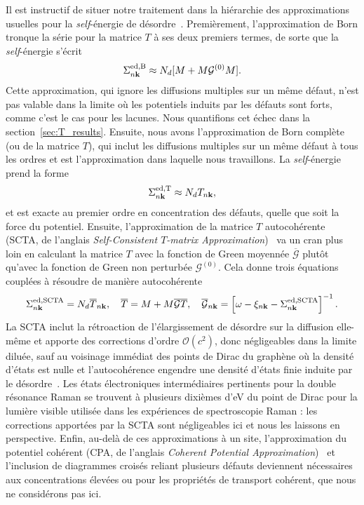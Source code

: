 Il est instructif de situer notre traitement dans la hiérarchie des approximations usuelles pour la \textit{self}-énergie de désordre~\cite{elliottTheoryPropertiesRandomly1974}. Premièrement, l'approximation de Born tronque la série pour la matrice $T$ à ses deux premiers termes, de sorte que la \textit{self}-énergie s'écrit
\begin{equation}
    \Sigma_{n\mathbf{k}}^\text{ed,B}\approx N_d[M+M\mathcal{G}^{(0)}M].
\end{equation}
Cette approximation, qui ignore les diffusions multiples sur un même défaut, n'est pas valable dans la limite où les potentiels induits par les défauts sont forts, comme c'est le cas pour les lacunes. Nous quantifions cet échec dans la section~\ref{sec:T_results}. Ensuite, nous avons l'approximation de Born complète (ou de la matrice $T$), qui inclut les diffusions multiples sur un même défaut à tous les ordres et est l'approximation dans laquelle nous travaillons. La \textit{self}-énergie prend la forme
\begin{equation}
    \Sigma_{n\mathbf{k}}^{\text{ed,T}}\approx N_dT_{n\mathbf{k}},
\end{equation}
et est exacte au premier ordre en concentration des défauts, quelle que soit la force du potentiel. Ensuite, l'approximation de la matrice $T$ autocohérente (SCTA, de l'anglais \textit{Self-Consistent $T$-matrix Approximation})~\cite{klauderModificationElectronEnergy1961,peresElectronicPropertiesDisordered2006} va un cran plus loin en calculant la matrice $T$ avec la fonction de Green moyennée $\overline{\mathcal{G}}$ plutôt qu'avec la fonction de Green non perturbée $\mathcal{G}^{(0)}$. Cela donne trois équations couplées à résoudre de manière autocohérente
\begin{equation}
    \Sigma_{n\mathbf{k}}^\text{ed,SCTA} = N_d\overline{T}_{n\mathbf{k}},\quad \overline{T} = M+M\overline{\mathcal{G}}\overline{T},\quad \overline{\mathcal{G}}_{n\mathbf{k}} = \left[\omega-\xi_{n\mathbf{k}}-\Sigma_{n\mathbf{k}}^\text{ed,SCTA} \right]^{-1}.
\end{equation}
La SCTA inclut la rétroaction de l'élargissement de désordre sur la diffusion elle-même et apporte des corrections d'ordre $\mathcal{O}(c^2)$, donc négligeables dans la limite diluée, sauf au voisinage immédiat des points de Dirac du graphène où la densité d'états est nulle et l'autocohérence engendre une densité d'états finie induite par le désordre~\cite{peresElectronicPropertiesDisordered2006}. Les états électroniques intermédiaires pertinents pour la double résonance Raman se trouvent à plusieurs dixièmes d'eV du point de Dirac pour la lumière visible utilisée dans les expériences de spectroscopie Raman : les corrections apportées par la SCTA sont négligeables ici et nous les laissons en perspective. Enfin, au-delà de ces approximations à un site, l'approximation du potentiel cohérent (CPA, de l'anglais \textit{Coherent Potential Approximation})~\cite{sovenCoherentPotentialModelSubstitutional1967} et l'inclusion de diagrammes croisés reliant plusieurs défauts deviennent nécessaires aux concentrations élevées ou pour les propriétés de transport cohérent, que nous ne considérons pas ici.

